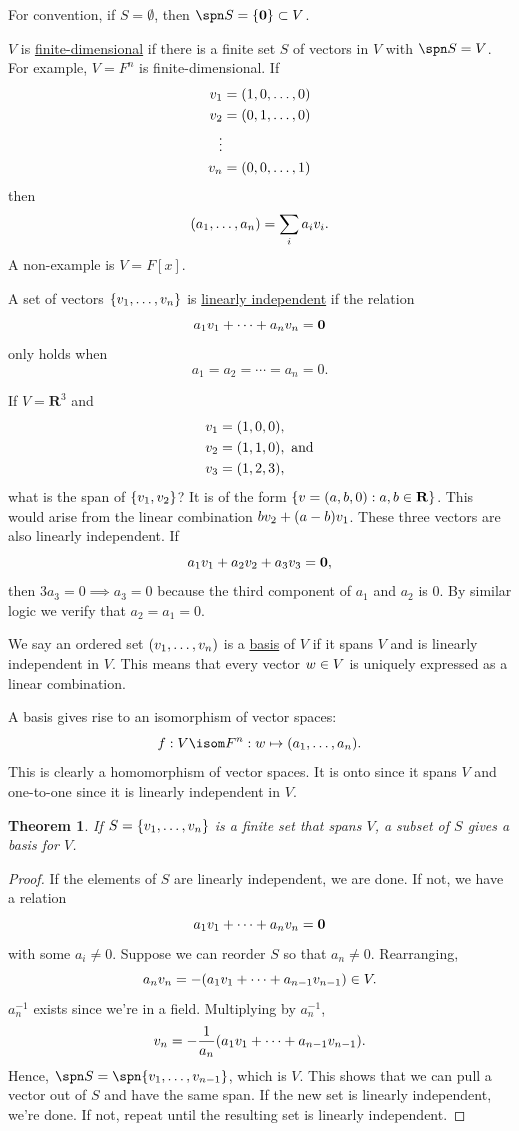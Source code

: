 \documentclass[11pt, oneside]{amsart}
\numberwithin{equation}{section}
\newtheorem{theorem}{Theorem}
\numberwithin{theorem}{section}
\theoremstyle{definition}
\let\bf\relax
\def\R{\mathbf{R}}
\def\0{\mathbf{0}}
\begin{document}
For convention, if $S=\emptyset$, then $\spn S = \{\0\}\subset V$.

$V$ is \underline{finite-dimensional} if there is a finite set $S$ of vectors in $V$ with $\spn S=V$.  For example, $V=F^n$ is finite-dimensional. If 
$$
\begin{aligned}
\bf{v}_1 &= (1,0,\hdots,0)\\\bf{v}_2 &= (0,1,\hdots,0)\\\vdots&\\\bf{v}_n &= (0,0,\hdots,1)
\end{aligned}
$$
then
$$
(a_1,\hdots,a_n)=\sum_i a_i\bf{v}_i.
$$
A non-example is $V=F[x]$. 

A set of vectors $\{\bf{v}_1,\hdots,\bf{v}_n\}$ is \underline{linearly independent} if the relation $$a_1\bf{v}_1+\cdots+a_n\bf{v}_n=\0$$ only holds when
$$
a_1=a_2=\cdots=a_n=0.
$$

If $V=\R^3$ and 
$$
\begin{aligned}
\bf{v}_1 &= (1,0,0),\\\bf{v}_2 &= (1,1,0), \textrm{ and}\\\bf{v}_3 &= (1,2,3),
\end{aligned}
$$
what is the span of $\{\bf{v}_1, \bf{v}_2\}$? It is of the form $\{\bf{v}=(a,b,0):a,b\in\R\}$. This would arise from the linear combination $b\bf{v}_2 + (a-b)\bf{v}_1$. These three vectors are also linearly independent. If
$$a_1\bf{v}_1+a_2\bf{v}_2+a_3\bf{v}_3=\0,$$
then $3a_3=0\implies a_3=0$ because the third component of $a_1$ and $a_2$ is 0. By similar logic we verify that $a_2=a_1=0$.

We say an ordered set $(\bf{v}_1,\hdots,\bf{v}_n)$ is a \underline{basis} of $V$ if it spans $V$ and is linearly independent in $V$. This means that every vector $\bf{w}\in V$ is uniquely expressed as a linear combination.

A basis gives rise to an isomorphism of vector spaces: $$f: V\isom F^n : \bf{w}\mapsto (a_1, \hdots, a_n).$$ This is clearly a homomorphism of vector spaces. It is onto since it spans $V$ and one-to-one since it is linearly independent in $V$.

\begin{theorem}
If $S = \{\bf{v}_1,\hdots,\bf{v}_n\}$ is a finite set that spans $V$, a subset of $S$ gives a basis for $V$.
\end{theorem}
\begin{proof}
If the elements of $S$ are linearly independent, we are done. If not, we have a relation
$$
a_1\bf{v}_1+\cdots+a_n\bf{v}_n=\0
$$
with some $a_i\ne 0$. Suppose we can reorder $S$ so that $a_n\ne 0$. Rearranging, 
$$
a_n\bf{v}_n=-(a_1\bf{v}_1+\cdots+a_{n-1}\bf{v}_{n-1}) \in V.
$$
$a_n^{-1}$ exists since we're in a field. Multiplying by $a_n^{-1}$,
$$
\bf{v}_n = -\frac{1}{a_n} (a_1\bf{v}_1+\cdots+a_{n-1}\bf{v}_{n-1}).
$$
Hence, $\spn S = \spn \{\bf{v}_1,\hdots,\bf{v}_{n-1}\}$, which is $V$. This shows that we can pull a vector out of $S$ and have the same span. If the new set is linearly independent, we're done. If not, repeat until the resulting set is linearly independent.
\end{proof}
\end{document}
